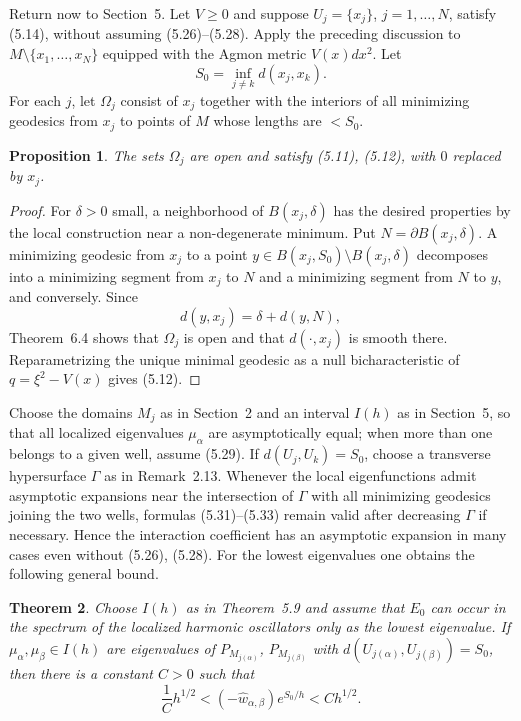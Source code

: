 \documentclass[11pt,a4paper]{article}
\numberwithin{equation}{section}
\newtheorem{theorem}{Theorem}[section]
\newtheorem{proposition}[theorem]{Proposition}
\theoremstyle{remark}
\begin{document}
Return now to Section~5. Let $V\ge0$ and suppose $U_j=\{x_j\}$, $j=1,\ldots,N$, satisfy (5.14), without assuming (5.26)--(5.28). Apply the preceding discussion to
$M\setminus\{x_1,\ldots,x_N\}$ equipped with the Agmon metric $V(x)dx^2$. Let
\[
S_0=\inf_{j\ne k}d(x_j,x_k).
\]
For each $j$, let $\Omega_j$ consist of $x_j$ together with the interiors of all minimizing geodesics from $x_j$ to points of $M$ whose lengths are $<S_0$.

\begin{proposition}
The sets $\Omega_j$ are open and satisfy (5.11), (5.12), with $0$ replaced by $x_j$.
\end{proposition}
\begin{proof}
For $\delta>0$ small, a neighborhood of $B(x_j,\delta)$ has the desired properties by the local construction near a non-degenerate minimum. Put $N=\partial B(x_j,\delta)$. A minimizing geodesic from $x_j$ to a point $y\in B(x_j,S_0)\setminus B(x_j,\delta)$ decomposes into a minimizing segment from $x_j$ to $N$ and a minimizing segment from $N$ to $y$, and conversely. Since
\[
d(y,x_j)=\delta+d(y,N),
\]
Theorem~6.4 shows that $\Omega_j$ is open and that $d(\cdot,x_j)$ is smooth there. Reparametrizing the unique minimal geodesic as a null bicharacteristic of $q=\xi^2-V(x)$ gives (5.12).
\end{proof}

Choose the domains $M_j$ as in Section~2 and an interval $I(h)$ as in Section~5, so that all localized eigenvalues $\mu_\alpha$ are asymptotically equal; when more than one belongs to a given well, assume (5.29). If $d(U_j,U_k)=S_0$, choose a transverse hypersurface $\Gamma$ as in Remark~2.13. Whenever the local eigenfunctions admit asymptotic expansions near the intersection of $\Gamma$ with all minimizing geodesics joining the two wells, formulas (5.31)--(5.33) remain valid after decreasing $\Gamma$ if necessary. Hence the interaction coefficient has an asymptotic expansion in many cases even without (5.26), (5.28). For the lowest eigenvalues one obtains the following general bound.

\begin{theorem}
Choose $I(h)$ as in Theorem~5.9 and assume that $E_0$ can occur in the spectrum of the localized harmonic oscillators only as the lowest eigenvalue. If $\mu_\alpha,\mu_\beta\in I(h)$ are eigenvalues of $P_{M_{j(\alpha)}}$, $P_{M_{j(\beta)}}$ with
$d(U_{j(\alpha)},U_{j(\beta)})=S_0$, then there is a constant $C>0$ such that
\[
\frac1C h^{1/2}
<(-\widehat w_{\alpha,\beta})e^{S_0/h}
<C h^{1/2}.
\]
\end{theorem}
\end{document}
